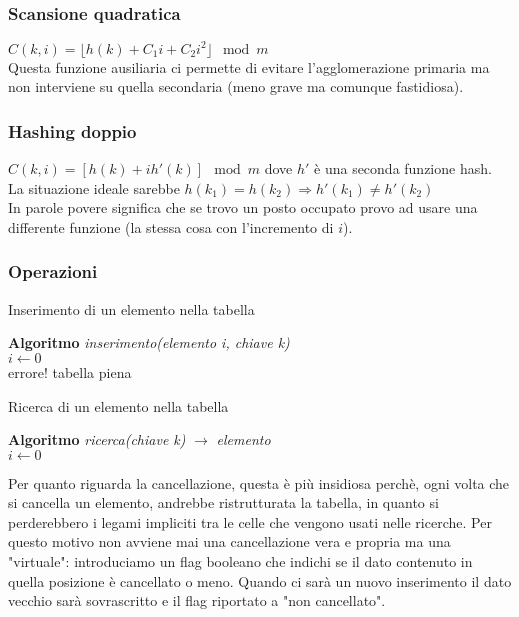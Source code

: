 \subsubsection{Scansione quadratica}
$C(k,i) = \lfloor h(k)+C_{1}i+C_{2}i^2 \rfloor \mod{m}$\\
Questa funzione ausiliaria ci permette di evitare l'agglomerazione primaria ma non interviene su
quella secondaria (meno grave ma comunque fastidiosa).

\subsubsection{Hashing doppio}
$C(k,i) = [h(k)+ih'(k)] \mod{m}$ dove $h'$ è una seconda funzione hash.
La situazione ideale sarebbe $h(k_{1}) = h(k_2) \Rightarrow h'(k_{1}) \neq h'(k_2)$\\
In parole povere significa che se trovo un posto occupato provo ad usare una differente
funzione (la stessa cosa con l'incremento di $i$).

\subsubsection{Operazioni}

\begin{algorithm}
    \caption{Inserimento di un elemento nella tabella}
    \Indm\textbf{Algoritmo} \emph{inserimento(elemento i, chiave k)}\\
    \Indp$i \leftarrow 0$\\
     {
        errore! tabella piena
    }
\end{algorithm}

\begin{algorithm}
    \caption{Ricerca di un elemento nella tabella}
    \Indm\textbf{Algoritmo} \emph{ricerca(chiave k)} $\rightarrow$ \emph{elemento}\\
    \Indp$i \leftarrow 0$\\
     {
    }
\end{algorithm}
Per quanto riguarda la cancellazione, questa è più insidiosa perchè, ogni volta che si cancella un
elemento, andrebbe ristrutturata la tabella, in quanto si perderebbero i legami impliciti
tra le celle che vengono usati nelle ricerche. Per questo motivo non avviene mai 
una cancellazione vera e propria ma una "virtuale": introduciamo un flag booleano
che indichi se il dato contenuto in quella posizione è cancellato o meno. Quando ci sarà 
un nuovo inserimento il dato vecchio sarà sovrascritto e il flag riportato a "non cancellato".

